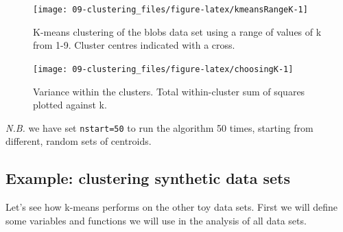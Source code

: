 \documentclass[]{book}
\newenvironment{Shaded}{\begin{snugshade}}{\end{snugshade}}
\newcommand{\KeywordTok}[1]{\textcolor[rgb]{0.13,0.29,0.53}{\textbf{{#1}}}}
\newcommand{\DataTypeTok}[1]{\textcolor[rgb]{0.13,0.29,0.53}{{#1}}}
\newcommand{\StringTok}[1]{\textcolor[rgb]{0.31,0.60,0.02}{{#1}}}
\newcommand{\NormalTok}[1]{{#1}}
\theoremstyle{definition}
\theoremstyle{definition}
\theoremstyle{definition}
\theoremstyle{remark}
\begin{document}
\begin{figure}

{\centering \texttt{[image: 09-clustering\_files/figure-latex/kmeansRangeK-1]} 

}

\caption{K-means clustering of the blobs data set using a range of values of k from 1-9. Cluster centres indicated with a cross.}\label{fig:kmeansRangeK}
\end{figure}

\begin{Shaded}
\end{Shaded}

\begin{figure}

{\centering \texttt{[image: 09-clustering\_files/figure-latex/choosingK-1]} 

}

\caption{Variance within the clusters. Total within-cluster sum of squares plotted against k.}\label{fig:choosingK}
\end{figure}

\emph{N.B.} we have set \texttt{nstart=50} to run the algorithm 50
times, starting from different, random sets of centroids.

\subsection{Example: clustering synthetic data
sets}\label{example-clustering-synthetic-data-sets-1}

Let's see how k-means performs on the other toy data sets. First we will
define some variables and functions we will use in the analysis of all
data sets.
\end{document}
